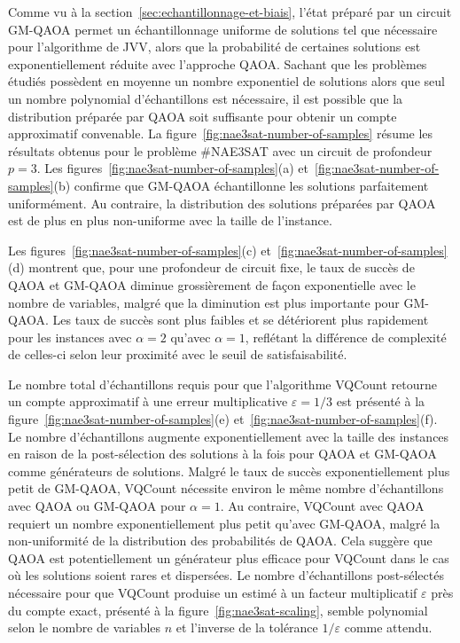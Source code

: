 Comme vu à la section~\ref{sec:echantillonnage-et-biais}, l'état préparé par un circuit GM-QAOA permet un échantillonnage uniforme de solutions tel que nécessaire pour l'algorithme de JVV, alors que la probabilité de certaines solutions est exponentiellement réduite avec l'approche QAOA. Sachant que les problèmes étudiés possèdent en moyenne un nombre exponentiel de solutions alors que seul un nombre polynomial d'échantillons est nécessaire, il est possible que la distribution préparée par QAOA soit suffisante pour obtenir un compte approximatif convenable. La figure~\ref{fig:nae3sat-number-of-samples} résume les résultats obtenus pour le problème \#NAE3SAT avec un circuit de profondeur $p=3$. Les figures~\ref{fig:nae3sat-number-of-samples}(a) et~\ref{fig:nae3sat-number-of-samples}(b) confirme que GM-QAOA échantillonne les solutions parfaitement uniformément. Au contraire, la distribution des solutions préparées par QAOA est de plus en plus non-uniforme avec la taille de l'instance. 

Les figures~\ref{fig:nae3sat-number-of-samples}(c) et~\ref{fig:nae3sat-number-of-samples}(d) montrent que, pour une profondeur de circuit fixe, le taux de succès de QAOA et GM-QAOA diminue grossièrement de façon exponentielle avec le nombre de variables, malgré que la diminution est plus importante pour GM-QAOA. Les taux de succès sont plus faibles et se détériorent plus rapidement pour les instances avec $\alpha = 2$ qu'avec $\alpha=1$, reflétant la différence de complexité de celles-ci selon leur proximité avec le seuil de satisfaisabilité. 

Le nombre total d'échantillons requis pour que l'algorithme VQCount retourne un compte approximatif à une erreur multiplicative $\varepsilon = 1/3$ est présenté à la figure~\ref{fig:nae3sat-number-of-samples}(e) et~\ref{fig:nae3sat-number-of-samples}(f). Le nombre d'échantillons augmente exponentiellement avec la taille des instances en raison de la post-sélection des solutions à la fois pour QAOA et GM-QAOA comme générateurs de solutions. Malgré le taux de succès exponentiellement plus petit de GM-QAOA, VQCount nécessite environ le même nombre d'échantillons avec QAOA ou GM-QAOA pour $\alpha=1$. Au contraire, VQCount avec QAOA requiert un nombre exponentiellement plus petit qu'avec GM-QAOA, malgré la non-uniformité de la distribution des probabilités de QAOA. Cela suggère que QAOA est potentiellement un générateur plus efficace pour VQCount dans le cas où les solutions soient rares et dispersées. Le nombre d'échantillons post-sélectés nécessaire pour que VQCount produise un estimé à un facteur multiplicatif $\varepsilon$ près du compte exact, présenté à la figure~\ref{fig:nae3sat-scaling}, semble polynomial selon le nombre de variables $n$ et l'inverse de la tolérance $1/\varepsilon$ comme attendu.

